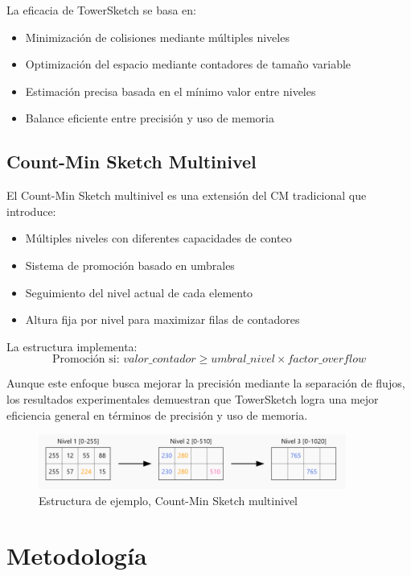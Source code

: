 \documentclass[a4paper,12pt]{article}
\begin{document}
La eficacia de TowerSketch se basa en:
\begin{itemize}
    \item Minimización de colisiones mediante múltiples niveles
    \item Optimización del espacio mediante contadores de tamaño variable
    \item Estimación precisa basada en el mínimo valor entre niveles
    \item Balance eficiente entre precisión y uso de memoria
\end{itemize}

\subsection{Count-Min Sketch Multinivel}
El Count-Min Sketch multinivel es una extensión del CM tradicional que introduce:

\begin{itemize}
    \item Múltiples niveles con diferentes capacidades de conteo
    \item Sistema de promoción basado en umbrales
    \item Seguimiento del nivel actual de cada elemento
    \item Altura fija por nivel para maximizar filas de contadores
\end{itemize}

La estructura implementa:
\begin{equation}
    \text{Promoción si: } valor\_contador \geq umbral\_nivel \times factor\_overflow
\end{equation}

Aunque este enfoque busca mejorar la precisión mediante la separación de flujos, los resultados experimentales demuestran que TowerSketch logra una mejor eficiencia general en términos de precisión y uso de memoria.

\begin{figure}[h]
    \centering
    \includegraphics[width=0.9\textwidth]{img/ml-cm.png}
    \caption{Estructura de ejemplo, Count-Min Sketch multinivel}
\end{figure}

\newpage
\section{Metodología}
\end{document}

